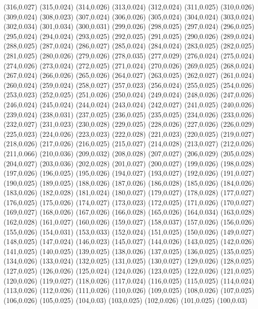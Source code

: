 (316,0.027)
(315,0.024)
(314,0.026)
(313,0.024)
(312,0.024)
(311,0.025)
(310,0.026)
(309,0.024)
(308,0.023)
(307,0.024)
(306,0.026)
(305,0.024)
(304,0.024)
(303,0.024)
(302,0.034)
(301,0.034)
(300,0.031)
(299,0.026)
(298,0.025)
(297,0.024)
(296,0.025)
(295,0.024)
(294,0.024)
(293,0.025)
(292,0.025)
(291,0.025)
(290,0.026)
(289,0.024)
(288,0.025)
(287,0.024)
(286,0.027)
(285,0.024)
(284,0.024)
(283,0.025)
(282,0.025)
(281,0.025)
(280,0.026)
(279,0.026)
(278,0.035)
(277,0.029)
(276,0.024)
(275,0.024)
(274,0.026)
(273,0.024)
(272,0.025)
(271,0.024)
(270,0.026)
(269,0.025)
(268,0.024)
(267,0.024)
(266,0.026)
(265,0.026)
(264,0.027)
(263,0.025)
(262,0.027)
(261,0.024)
(260,0.024)
(259,0.024)
(258,0.027)
(257,0.023)
(256,0.024)
(255,0.025)
(254,0.026)
(253,0.023)
(252,0.025)
(251,0.026)
(250,0.024)
(249,0.024)
(248,0.026)
(247,0.026)
(246,0.024)
(245,0.024)
(244,0.024)
(243,0.024)
(242,0.027)
(241,0.025)
(240,0.026)
(239,0.024)
(238,0.031)
(237,0.025)
(236,0.025)
(235,0.025)
(234,0.026)
(233,0.026)
(232,0.027)
(231,0.023)
(230,0.028)
(229,0.025)
(228,0.026)
(227,0.026)
(226,0.029)
(225,0.023)
(224,0.026)
(223,0.023)
(222,0.028)
(221,0.023)
(220,0.025)
(219,0.027)
(218,0.026)
(217,0.026)
(216,0.025)
(215,0.027)
(214,0.028)
(213,0.027)
(212,0.026)
(211,0.066)
(210,0.036)
(209,0.032)
(208,0.028)
(207,0.027)
(206,0.029)
(205,0.028)
(204,0.027)
(203,0.036)
(202,0.028)
(201,0.027)
(200,0.027)
(199,0.026)
(198,0.028)
(197,0.026)
(196,0.025)
(195,0.026)
(194,0.027)
(193,0.027)
(192,0.026)
(191,0.027)
(190,0.025)
(189,0.025)
(188,0.026)
(187,0.026)
(186,0.028)
(185,0.026)
(184,0.026)
(183,0.026)
(182,0.028)
(181,0.024)
(180,0.027)
(179,0.027)
(178,0.028)
(177,0.027)
(176,0.025)
(175,0.026)
(174,0.027)
(173,0.023)
(172,0.025)
(171,0.026)
(170,0.027)
(169,0.027)
(168,0.026)
(167,0.026)
(166,0.028)
(165,0.026)
(164,0.034)
(163,0.028)
(162,0.028)
(161,0.027)
(160,0.026)
(159,0.027)
(158,0.037)
(157,0.026)
(156,0.026)
(155,0.026)
(154,0.031)
(153,0.033)
(152,0.024)
(151,0.025)
(150,0.026)
(149,0.027)
(148,0.025)
(147,0.024)
(146,0.023)
(145,0.027)
(144,0.026)
(143,0.025)
(142,0.026)
(141,0.025)
(140,0.025)
(139,0.025)
(138,0.026)
(137,0.025)
(136,0.025)
(135,0.025)
(134,0.026)
(133,0.024)
(132,0.025)
(131,0.025)
(130,0.027)
(129,0.026)
(128,0.025)
(127,0.025)
(126,0.026)
(125,0.024)
(124,0.026)
(123,0.025)
(122,0.026)
(121,0.025)
(120,0.026)
(119,0.027)
(118,0.026)
(117,0.024)
(116,0.025)
(115,0.025)
(114,0.024)
(113,0.026)
(112,0.026)
(111,0.026)
(110,0.026)
(109,0.025)
(108,0.026)
(107,0.025)
(106,0.026)
(105,0.025)
(104,0.03)
(103,0.025)
(102,0.026)
(101,0.025)
(100,0.03)
